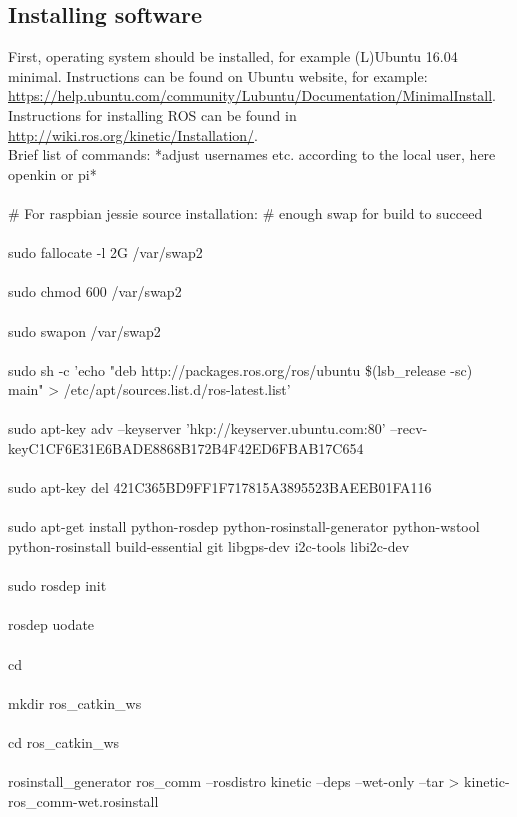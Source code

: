 \documentclass{report}
\begin{document}
\subsection{Installing software}
First, operating system should be installed, for example (L)Ubuntu 16.04 minimal. Instructions can be found on Ubuntu website, for example: \url{https://help.ubuntu.com/community/Lubuntu/Documentation/MinimalInstall}. 
\\
Instructions for installing ROS can be found in \url{http://wiki.ros.org/kinetic/Installation/}.\\
Brief list of commands:
*adjust usernames etc. according to the local user, here openkin or pi*\\
\\
\# For raspbian jessie source installation: \# enough swap for build to succeed \\
\\
sudo fallocate -l 2G /var/swap2 \\ 
\\
sudo chmod 600 /var/swap2 \\
\\
sudo swapon /var/swap2 \\
\\
sudo sh -c 'echo "deb http://packages.ros.org/ros/ubuntu \$(lsb\_release -sc) main" > /etc/apt/sources.list.d/ros-latest.list' \\
\\
sudo apt-key adv --keyserver 'hkp://keyserver.ubuntu.com:80' --recv-keyC1CF6E31E6BADE8868B172B4F42ED6FBAB17C654 \\
\\
sudo apt-key del 421C365BD9FF1F717815A3895523BAEEB01FA116 \\
\\
sudo apt-get install python-rosdep python-rosinstall-generator python-wstool python-rosinstall build-essential git libgps-dev i2c-tools libi2c-dev \\
\\
sudo rosdep init \\
\\
rosdep uodate \\
\\
cd \\ 
\\
mkdir ros\_catkin\_ws \\
\\
cd ros\_catkin\_ws \\
\\
rosinstall\_generator ros\_comm --rosdistro kinetic --deps --wet-only --tar > kinetic-ros\_comm-wet.rosinstall \\
\end{document}
